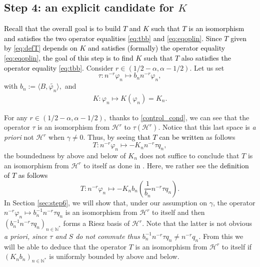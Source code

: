 \documentclass[11pt, dvipsnames]{amsart}
\begin{document}
\subsection{Step 4: an explicit candidate for $K$}
\label{sec:step4}
{\color{black}
\textcolor{black}{Recall that the overall goal is to build $T$ and $K$ such that $T$ is an isomorphism and satisfies the two operator equalities \eqref{eq:tbb} and \eqref{eq:eqoplin}. Since $T$ given by \eqref{eq:defT} depends on $K$ and satisfies (formally) the operator equality \eqref{eq:eqoplin}, the goal of this step is to find $K$ such that $T$ also satisfies the operator equality \eqref{eq:tbb}.} Consider $r\in (1/2-\alpha,\alpha-1/2).$ Let us set 
\begin{equation} \label{eq:deftau}
 \tau: n^{-r}\varphi_n\mapsto b_n n^{-r}\varphi_n,
\end{equation} with $b_n:=\langle B, \widetilde{\varphi_n}\rangle,$ and \begin{align}
   K:\varphi_n\mapsto K(\varphi_n)=K_n.\label{K-phi-n}
\end{align} 

For any $r\in (1/2-\alpha,\alpha-1/2),$ thanks to \eqref{control_cond}, we can see that the operator $\tau$ is an isomorphism from $\mathcal{H}^r$ to $\tau(\mathcal{H}^r).$ Notice that this last space is \emph{a priori} not $\mathcal{H}^r$ when $\gamma\neq0$. Thus, by seeing \textcolor{black}{that $T$ can be written} as follows
\begin{equation}
\label{eq:decompT2}
T : n^{-r}\varphi_{n}\mapsto -K_n n^{-r}\tau q_n,
\end{equation}  the boundedness by above and below of $K_n$ does not suffice to conclude that $T$ is an isomorphism from $\mathcal{H}^r$ to itself as done in \cite{Gagnon2022-fredholm}. Here, we rather see the \textcolor{black}{definition of $T$ as follows}
\begin{equation*}
T : n^{-r}\varphi_{n}\mapsto -K_n b_n (\frac{1}{b_n} n^{-r}\tau q_n).
\end{equation*} 
In Section \ref{sec:step6}, we will show that, under our assumption on $\gamma$, the operator $n^{-r}\varphi_{n}\mapsto  b_n^{-1} n^{-r}\tau q_n$ is an isomorphism from $\mathcal{H}^r$ to itself and then $(b_n^{-1} n^{-r}\tau q_n)_{n\in \mathbb{N}^*}$ forms a Riesz basis of $\mathcal{H}^r$. Note that the latter is not obvious \emph{a priori, since $\tau$ and $S$ do not commute thus $b_n^{-1} n^{-r}\tau q_n\neq n^{-r}q_{n}$.}
From this we will be able to deduce that the operator $T$ is an isomorphism from $\mathcal{H}^r$ to itself if $(K_{n} b_n)_{n\in\mathbb{N}^*}$ is uniformly bounded by above and below.\\
 
}
\end{document}
